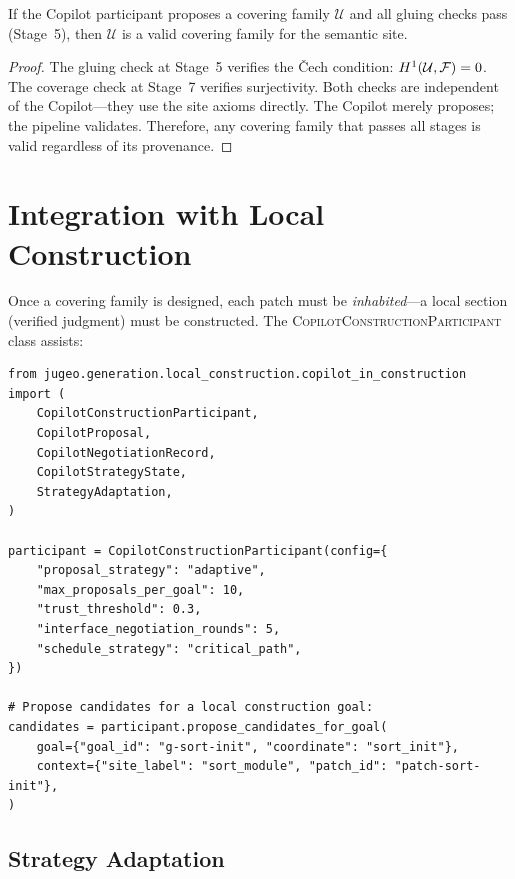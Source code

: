 \documentclass[11pt]{article}
\newcommand{\ConstrPart}{\textsc{CopilotConstructionParticipant}}
\newcommand{\covfam}{\mathcal{U}}
\begin{document}
\begin{theorem}\label{thm:participant-sound}
If the Copilot participant proposes a covering family $\covfam$ and all
gluing checks pass (Stage~5), then $\covfam$ is a valid covering family
for the semantic site.
\end{theorem}

\begin{proof}
The gluing check at Stage~5 verifies the \v{C}ech condition:
$\Hcoh{1}(\covfam, \mathcal{F}) = 0$.  The coverage check at Stage~7
verifies surjectivity.  Both checks are independent of the Copilot---they
use the site axioms directly.  The Copilot merely proposes; the pipeline
validates.  Therefore, any covering family that passes all stages is valid
regardless of its provenance.
\end{proof}

\section{Integration with Local Construction}\label{sec:construction}

Once a covering family is designed, each patch must be \emph{inhabited}---a
local section (verified judgment) must be constructed.  The \ConstrPart{}
class assists:

\begin{lstlisting}[style=jugeo-python]
from jugeo.generation.local_construction.copilot_in_construction import (
    CopilotConstructionParticipant,
    CopilotProposal,
    CopilotNegotiationRecord,
    CopilotStrategyState,
    StrategyAdaptation,
)

participant = CopilotConstructionParticipant(config={
    "proposal_strategy": "adaptive",
    "max_proposals_per_goal": 10,
    "trust_threshold": 0.3,
    "interface_negotiation_rounds": 5,
    "schedule_strategy": "critical_path",
})

# Propose candidates for a local construction goal:
candidates = participant.propose_candidates_for_goal(
    goal={"goal_id": "g-sort-init", "coordinate": "sort_init"},
    context={"site_label": "sort_module", "patch_id": "patch-sort-init"},
)
\end{lstlisting}

\subsection{Strategy Adaptation}
\end{document}
